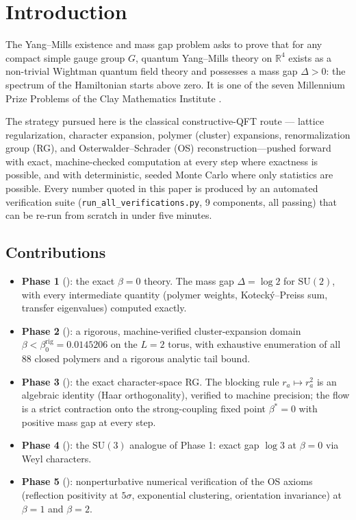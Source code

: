 \documentclass[11pt,a4paper]{article}
\newcommand{\SU}{\mathrm{SU}}
\newcommand{\R}{\mathbb{R}}
\newcommand{\gap}{\Delta}
\newcommand{\betaZ}{\beta_0}
\begin{document}
\tableofcontents

\section{Introduction}
\label{sec:intro}

The Yang--Mills existence and mass gap problem asks to prove that for any
compact simple gauge group $G$, quantum Yang--Mills theory on $\R^4$ exists
as a non-trivial Wightman quantum field theory and possesses a mass gap
$\gap > 0$: the spectrum of the Hamiltonian starts above zero.  It is one of
the seven Millennium Prize Problems of the Clay Mathematics Institute
\cite{jaffe2000}.

The strategy pursued here is the classical constructive-QFT route --- lattice
regularization, character expansion, polymer (cluster) expansions,
renormalization group (RG), and Osterwalder--Schrader (OS)
reconstruction---pushed forward with exact, machine-checked computation at
every step where exactness is possible, and with deterministic, seeded Monte
Carlo where only statistics are possible.  Every number quoted in this paper
is produced by an automated verification suite
(\texttt{run\_all\_verifications.py}, 9 components, all passing) that can be
re-run from scratch in under five minutes.

\subsection{Contributions}
\label{sec:contributions}

\begin{itemize}[leftmargin=1.5em]
  \item \textbf{Phase 1} (): the exact $\beta = 0$ theory.
    The mass gap $\gap = \log 2$ for $\SU(2)$, with every intermediate
    quantity (polymer weights, Koteck\'y--Preiss sum, transfer eigenvalues)
    computed exactly.
  \item \textbf{Phase 2} (): a rigorous, machine-verified
    cluster-expansion domain $\beta < \betaZ^{\mathrm{rig}} = 0.0145206$ on
    the $L=2$ torus, with exhaustive enumeration of all $88$ closed polymers
    and a rigorous analytic tail bound.
  \item \textbf{Phase 3} (): the exact character-space RG.
    The blocking rule $r_a \mapsto r_a^2$ is an algebraic identity (Haar
    orthogonality), verified to machine precision; the flow is a strict
    contraction onto the strong-coupling fixed point $\beta^* = 0$ with
    positive mass gap at every step.
  \item \textbf{Phase 4} (): the $\SU(3)$ analogue of
    Phase 1: exact gap $\log 3$ at $\beta = 0$ via Weyl characters.
  \item \textbf{Phase 5} (): nonperturbative numerical
    verification of the OS axioms (reflection positivity at $5\sigma$,
    exponential clustering, orientation invariance) at $\beta = 1$ and
    $\beta = 2$.
\end{itemize}
\end{document}
